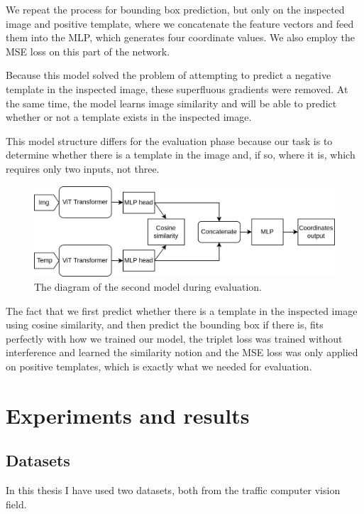\documentclass{report}[12pt, a4paper]
\begin{document}
We repeat the process for bounding box prediction, but only on the inspected image and positive template, where we concatenate the feature vectors and feed them into the MLP, which generates four coordinate values. We also employ the MSE loss on this part of the network.

Because this model solved the problem of attempting to predict a negative template in the inspected image, these superfluous gradients were removed. At the same time, the model learns image similarity and will be able to predict whether or not a template exists in the inspected image.

This model structure differs for the evaluation phase because our task is to determine whether there is a template in the image and, if so, where it is, which requires only two inputs, not three.

\begin{figure}[htp]
    \centering
    \includegraphics[width=14cm]{second_approach_diagram_eval}
    \caption{The diagram of the second model during evaluation.}
    \label{fig:second_approach_diagram_eval}
\end{figure}

The fact that we first predict whether there is a template in the inspected image using cosine similarity, and then predict the bounding box if there is, fits perfectly with how we trained our model, the triplet loss was trained without interference and learned the similarity notion and the MSE loss was only applied on positive templates, which is exactly what we needed for evaluation.

\chapter{Experiments and results}

\section{Datasets}

In this thesis I have used two datasets, both from the traffic computer vision field.
\end{document}
